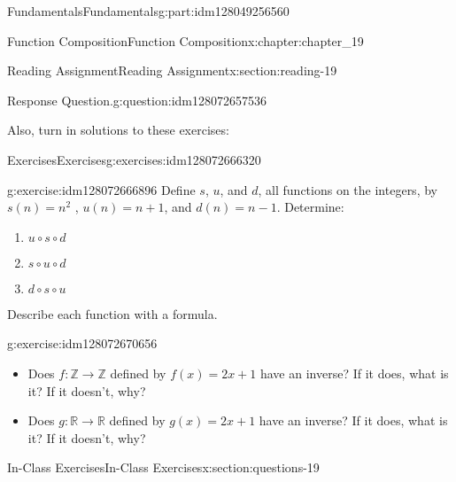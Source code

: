 \documentclass[oneside,10pt,]{book}
\numberwithin{equation}{section}
\begin{document}
\begin{partptx}{Fundamentals}{}{Fundamentals}{}{}{g:part:idm128049256560}
\begin{chapterptx}{Function Composition}{}{Function Composition}{}{}{x:chapter:chapter_19}
\begin{sectionptx}{Reading Assignment}{}{Reading Assignment}{}{}{x:section:reading-19}
\begin{question}{Response Question.}{g:question:idm128072657536}
\end{question}
Also, turn in solutions to these exercises:%
%
%
\typeout{************************************************}
\typeout{************************************************}
%
\begin{exercises-subsection}{Exercises}{}{Exercises}{}{}{g:exercises:idm128072666320}
\par\medskip\noindent%
%
\begin{exercisegroup}
\begin{divisionexerciseeg}{1}{}{}{g:exercise:idm128072666896}%
Define \(s\), \(u\), and \(d\), all functions on the integers, by \(s(n) = n^2\) , \(u(n) = n + 1\), and \(d(n) = n-1\). Determine:%
\begin{enumerate}[label=(\alph*)]
\item{}\(\displaystyle u \circ  s \circ  d\)%
\item{}\(\displaystyle s \circ  u\circ  d\)%
\item{}\(\displaystyle d \circ  s \circ  u\)%
\end{enumerate}
Describe each function with a formula.%
\end{divisionexerciseeg}%
\begin{divisionexerciseeg}{2}{}{}{g:exercise:idm128072670656}%
%
\begin{itemize}[label=\textbullet]
\item{}Does \(f:\mathbb{Z} \rightarrow \mathbb{Z}\) defined by \(f(x)=2x+1\) have an inverse? If it does, what is it? If it doesn't, why?%
\item{}Does \(g:\mathbb{R} \rightarrow \mathbb{R}\) defined by \(g(x)=2x+1\) have an inverse? If it does, what is it? If it doesn't, why?%
\end{itemize}
%
\end{divisionexerciseeg}%
\end{exercisegroup}
\par\medskip\noindent
\end{exercises-subsection}
\end{sectionptx}
%
%
\typeout{************************************************}
\typeout{************************************************}
%
\begin{sectionptx}{In-Class Exercises}{}{In-Class Exercises}{}{}{x:section:questions-19}
%
%
%
\typeout{************************************************}
\typeout{************************************************}

\end{sectionptx}
\end{chapterptx}
\end{partptx}
\end{document}
